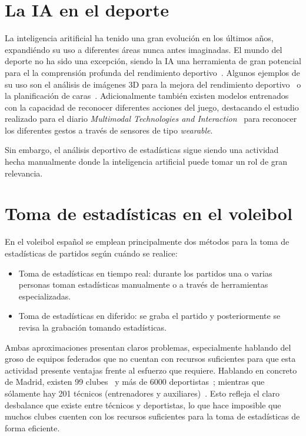 \documentclass[12pt]{report} %
\begin{document}
    \section{La IA en el deporte}
    La inteligencia aritificial ha tenido una gran evolución en los últimos
    años, expandiéndo su uso a diferentes áreas nunca antes imaginadas. El
    mundo del deporte no ha sido una excepción, siendo la IA una herramienta de
    gran potencial para el la comprensión profunda del rendimiento
    deportivo~\cite{ia-sport}. Algunos ejemplos de su uso son el análisis de
    imágenes 3D para la mejora del rendimiento deportivo~\cite{analysis3d} o la
    planificación de caras~\cite{wl}. Adicionalmente también existen modelos
    entrenados con la capacidad de reconocer diferentes acciones del juego,
    destacando el estudio realizado para el diario \textit{Multimodal
    Technologies and Interaction}~\cite{wearable} para reconocer los diferentes
    gestos a través de sensores de tipo \textit{wearable}.

    Sin embargo, el análisis deportivo de estadísticas sigue siendo una
    actividad hecha manualmente donde la inteligencia artificial puede tomar un
    rol de gran relevancia.


    \section{Toma de estadísticas en el voleibol}
    En el voleibol español se emplean principalmente dos
    métodos para la toma de estadísticas de partidos según cuándo se realice:
    \begin{itemize}
        \item Toma de estadísticas en tiempo real: durante los partidos una o
        varias personas toman estadísticas manualmente o a través de
        herramientas especializadas.
        \item Toma de estadísticas en diferido: se graba el partido y
        posteriormente se revisa la grabación tomando estadísticas.
    \end{itemize}

    Ambas aproximaciones presentan claros problemas, especialmente hablando del
    groso de equipos federados que no cuentan con recursos suficientes para que
    esta actividad presente ventajas frente al esfuerzo que requiere. Hablando
    en concreto de Madrid, existen 99 clubes~\cite{directorio-clubes} y más de
    6000 deportistas~\cite{estadisticasFEVB}; mientras que sólamente hay
    201 técnicos (entrenadores y auxiliares)~\cite{estadisticasFEVB}. Esto
    refleja el claro desbalance que existe entre técnicos y deportistas, lo que
    hace imposible que muchos clubes cuenten con los recursos suficientes para
    la toma de estadísticas de forma eficiente.
\end{document}
